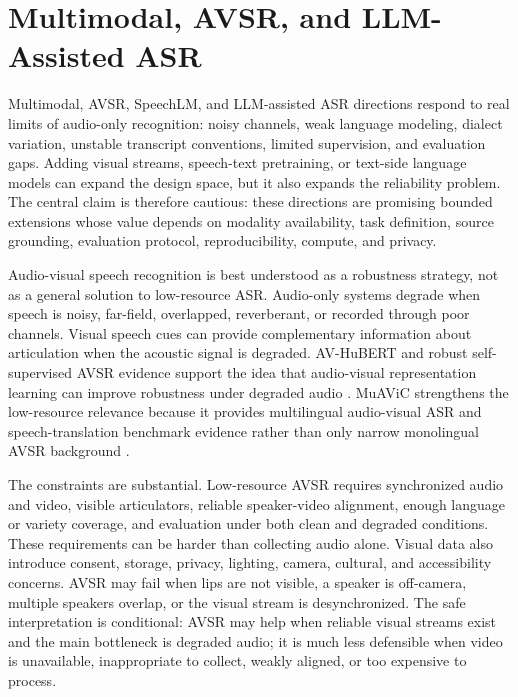 \documentclass[pdflatex,sn-basic,iicol]{sn-jnl}
\theoremstyle{thmstyleone}
\theoremstyle{thmstyletwo}
\theoremstyle{thmstylethree}
\begin{document}
\section{Multimodal, AVSR, and LLM-Assisted ASR}

Multimodal, AVSR, SpeechLM, and LLM-assisted ASR directions respond to real limits of audio-only recognition: noisy channels, weak language modeling, dialect variation, unstable transcript conventions, limited supervision, and evaluation gaps. Adding visual streams, speech-text pretraining, or text-side language models can expand the design space, but it also expands the reliability problem. The central claim is therefore cautious: these directions are promising bounded extensions whose value depends on modality availability, task definition, source grounding, evaluation protocol, reproducibility, compute, and privacy.

Audio-visual speech recognition is best understood as a robustness strategy, not as a general solution to low-resource ASR. Audio-only systems degrade when speech is noisy, far-field, overlapped, reverberant, or recorded through poor channels. Visual speech cues can provide complementary information about articulation when the acoustic signal is degraded. AV-HuBERT and robust self-supervised AVSR evidence support the idea that audio-visual representation learning can improve robustness under degraded audio \citep{shi2022avhubert,shi2022robustavsr}. MuAViC strengthens the low-resource relevance because it provides multilingual audio-visual ASR and speech-translation benchmark evidence rather than only narrow monolingual AVSR background \citep{anwar23_interspeech}.

The constraints are substantial. Low-resource AVSR requires synchronized audio and video, visible articulators, reliable speaker-video alignment, enough language or variety coverage, and evaluation under both clean and degraded conditions. These requirements can be harder than collecting audio alone. Visual data also introduce consent, storage, privacy, lighting, camera, cultural, and accessibility concerns. AVSR may fail when lips are not visible, a speaker is off-camera, multiple speakers overlap, or the visual stream is desynchronized. The safe interpretation is conditional: AVSR may help when reliable visual streams exist and the main bottleneck is degraded audio; it is much less defensible when video is unavailable, inappropriate to collect, weakly aligned, or too expensive to process.
\end{document}
